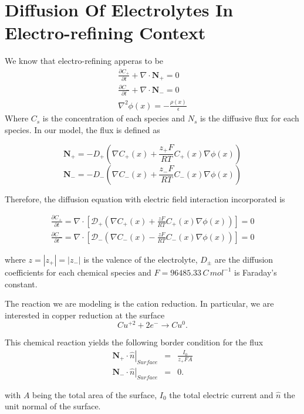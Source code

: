 \section{Diffusion Of Electrolytes In Electro-refining Context}

We know that electro-refining  apperas to be
\begin{eqnarray}
\frac{\partial C_+}{\partial t}+\nabla\cdot \mathbf{N}_+ = 0 \\
\frac{\partial C_-}{\partial t}+\nabla\cdot \mathbf{N}_- = 0 \\
\nabla^2\phi(x)=-\frac{\rho(x)}{\epsilon}
\end{eqnarray}
Where $C_s$ is the concentration of each species and $N_s$ is the diffusive flux for each species.
In our model, the flux is defined as

$$\mathbf{N}_+= -D_+\left(\nabla C_+(x) +\frac{z_+ F}{RT}C_+(x)\nabla\phi(x)\right)$$
$$\mathbf{N}_-= -D_-\left(\nabla C_-(x) +\frac{z_- F}{RT}C_-(x)\nabla\phi(x)\right)$$

Therefore, the diffusion equation with electric field interaction incorporated is \cite{Dolde2011}

\begin{eqnarray}
\frac{\partial C_+}{\partial t}=\nabla\cdot\left[ \mathcal{D}_+\left(\nabla C_+(x) +\frac{z F}{RT}C_+(x)\nabla\phi(x)\right)\right]= 0 \\
\frac{\partial C_-}{\partial t}=\nabla\cdot\left[ \mathcal{D}_-\left(\nabla C_-(x) -\frac{z F}{RT}C_-(x)\nabla\phi(x)\right)\right] = 0 
\end{eqnarray}

where $z = |z_+|=|z_-|$ is the valence of the electrolyte, $D_{\pm}$ are the diffusion coefficients for each chemical species and $F = 96485.33\,C\,mol^{-1}$ is Faraday's constant.

The reaction we are modeling is the cation reduction. In particular, we are interested in copper reduction at the surface
\begin{equation}
Cu^{+2} + 2 e^{-} \rightarrow Cu^{0}.
\end{equation}

This chemical reaction yields the following border condition for the flux
\begin{eqnarray}
\left.\mathbf{N}_{+}\cdot\hat{n}\right|_{Surface} &=& \frac{I_{0}}{z_{+}FA}\nonumber\\
\left.\mathbf{N}_{-}\cdot\hat{n}\right|_{Surface} &=& 0.
\label{eq_bc1}
\end{eqnarray}

with $A$ being the total area of the surface, $I_{0}$ the total electric current and $\hat{n}$ the unit normal of the surface.